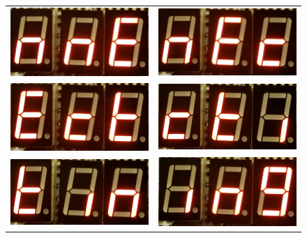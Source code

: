 \documentclass[a4paper,10pt]{article}
\begin{document}
\begin{figure}[H]
\begin{tabular}{cc}
    \includegraphics[width=60mm]{Assets/nne.png}&

    \includegraphics[width=60mm]{Assets/nec.png}\\
    
    \includegraphics[width=60mm]{Assets/ect.png}&

    \includegraphics[width=60mm]{Assets/cti.png}\\
    
    \includegraphics[width=60mm]{Assets/tin.png}&

    \includegraphics[width=60mm]{Assets/ing.png}\\
    

\end{tabular}
\end{figure}
\end{document}
